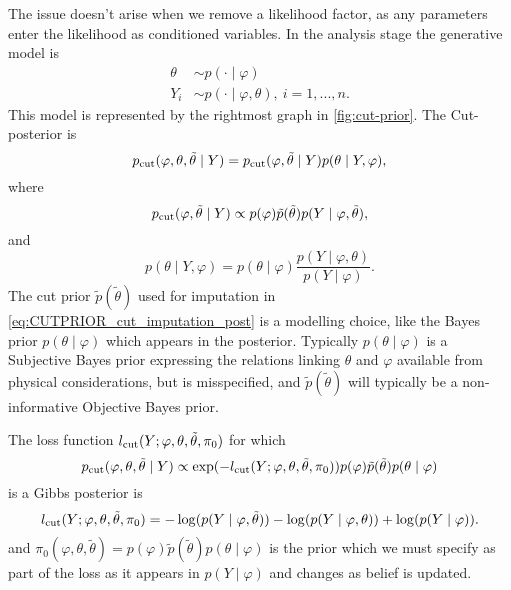 The issue doesn't arise when we remove a likelihood factor, as any parameters enter the likelihood as conditioned variables.
In the analysis stage the generative model is
\begin{align*}
  \theta & \sim p(\cdot \mid \varphi)                     \\
  Y_i    & \sim p(\cdot \mid \varphi,\theta),\ i=1,...,n.
\end{align*}
This model is represented by the rightmost graph in \cref{fig:cut-prior}.
The Cut-posterior is
\begin{equation}\label{eq:cut_posterior_CUTPRIOR}
  p_{\operatorname{\text{cut}}}(\varphi,\theta,\tilde\theta \mid Y)=p_{\operatorname{\text{cut}}}(\varphi,\tilde\theta \mid Y)p(\theta \mid Y,\varphi),
\end{equation}
where
\begin{equation}\label{eq:CUTPRIOR_cut_imputation_post}
  p_{\operatorname{\text{cut}}}(\varphi,\tilde\theta \mid Y)\propto p(\varphi)\tilde p(\tilde\theta)p(Y \mid \varphi,\tilde\theta),
\end{equation}
and
\begin{equation}\label{eq:cut_prior_ThetaAnalysis_post}
  p(\theta \mid Y,\varphi)=p(\theta \mid \varphi)\frac{p(Y \mid \varphi,\theta)}{p(Y \mid \varphi)}.
\end{equation}
The cut prior $\tilde p(\tilde\theta)$ used for imputation in \cref{eq:CUTPRIOR_cut_imputation_post} is a modelling choice, like the Bayes prior $p(\theta \mid \varphi)$ which appears in the posterior.
Typically $p(\theta \mid \varphi)$ is a Subjective Bayes prior expressing the relations linking $\theta$ and $\varphi$ available from physical considerations, but is misspecified, and $\tilde p(\tilde\theta)$ will typically be a non-informative Objective Bayes prior.

The loss function $l_{\operatorname{\text{cut}}}(Y; \varphi,\theta,\tilde\theta, \pi_0)$ for which
\[
  p_{\operatorname{\text{cut}}}(\varphi,\theta,\tilde\theta \mid Y)\propto \exp(-l_{\operatorname{\text{cut}}}(Y; \varphi,\theta,\tilde\theta, \pi_0))p(\varphi)\tilde p(\tilde\theta)p(\theta \mid \varphi)
\]
is a Gibbs posterior is
\begin{equation}\label{eq:HM_full_cut_loss}
  l_{\operatorname{\text{cut}}}(Y; \varphi,\theta,\tilde\theta, \pi_0)=-\log(p(Y \mid \varphi,\tilde\theta))-\log(p(Y \mid \varphi,\theta))+\log(p(Y \mid \varphi)).
\end{equation}
and $\pi_0(\varphi,\theta,\tilde\theta)=p(\varphi)\tilde p(\tilde\theta)p(\theta \mid \varphi)$ is the prior which we must specify as part of the loss as it appears in $p(Y \mid \varphi)$ and changes as belief is updated.


